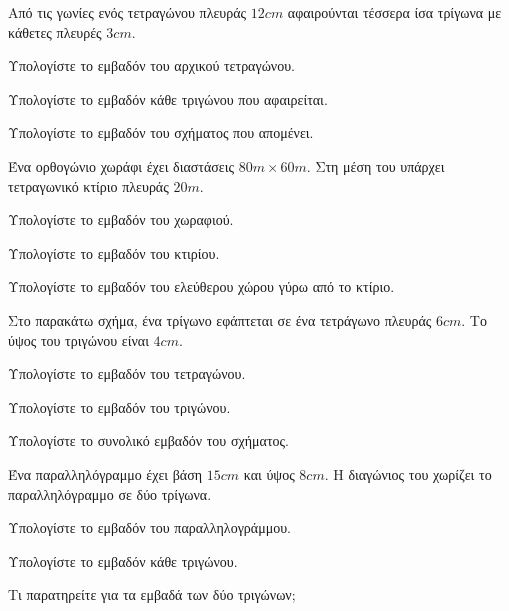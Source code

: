 \documentclass[11pt,a4paper,modern]{FFExercises}
\begin{document}
\askhsh Από τις γωνίες ενός τετραγώνου πλευράς $12\si{cm}$ αφαιρούνται τέσσερα ίσα τρίγωνα με κάθετες πλευρές $3\si{cm}$.
\begin{alist}
\item Υπολογίστε το εμβαδόν του αρχικού τετραγώνου.
\item Υπολογίστε το εμβαδόν κάθε τριγώνου που αφαιρείται.
\item Υπολογίστε το εμβαδόν του σχήματος που απομένει.
\end{alist}

\askhsh Ένα ορθογώνιο χωράφι έχει διαστάσεις $80\si{m}\times 60\si{m}$. Στη μέση του υπάρχει τετραγωνικό κτίριο πλευράς $20\si{m}$.
\begin{alist}
\item Υπολογίστε το εμβαδόν του χωραφιού.
\item Υπολογίστε το εμβαδόν του κτιρίου.
\item Υπολογίστε το εμβαδόν του ελεύθερου χώρου γύρω από το κτίριο.
\end{alist}

\askhsh Στο παρακάτω σχήμα, ένα τρίγωνο εφάπτεται σε ένα τετράγωνο πλευράς $6\si{cm}$. Το ύψος του τριγώνου είναι $4\si{cm}$.
\begin{center}
\end{center}
\begin{alist}
\item Υπολογίστε το εμβαδόν του τετραγώνου.
\item Υπολογίστε το εμβαδόν του τριγώνου.
\item Υπολογίστε το συνολικό εμβαδόν του σχήματος.
\end{alist}

\askhsh Ένα παραλληλόγραμμο έχει βάση $15\si{cm}$ και ύψος $8\si{cm}$. Η διαγώνιος του χωρίζει το παραλληλόγραμμο σε δύο τρίγωνα.
\begin{alist}
\item Υπολογίστε το εμβαδόν του παραλληλογράμμου.
\item Υπολογίστε το εμβαδόν κάθε τριγώνου.
\item Τι παρατηρείτε για τα εμβαδά των δύο τριγώνων;
\end{alist}
\end{document}
